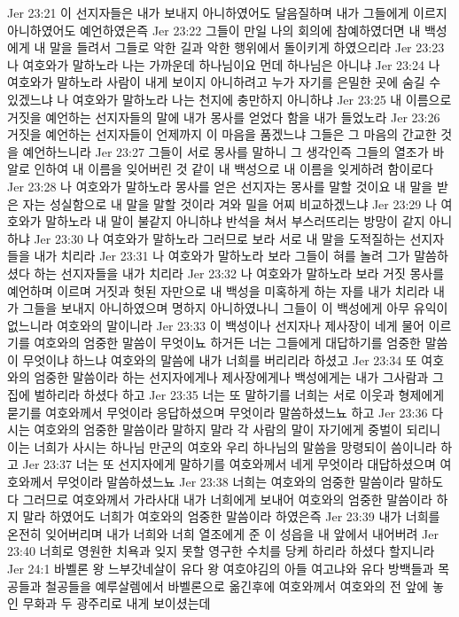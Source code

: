 Jer 23:21  이 선지자들은 내가 보내지 아니하였어도 달음질하며 내가 그들에게 이르지 아니하였어도 예언하였은즉
Jer 23:22  그들이 만일 나의 회의에 참예하였더면 내 백성에게 내 말을 들려서 그들로 악한 길과 악한 행위에서 돌이키게 하였으리라
Jer 23:23  나 여호와가 말하노라 나는 가까운데 하나님이요 먼데 하나님은 아니냐
Jer 23:24  나 여호와가 말하노라 사람이 내게 보이지 아니하려고 누가 자기를 은밀한 곳에 숨길 수 있겠느냐 나 여호와가 말하노라 나는 천지에 충만하지 아니하냐
Jer 23:25  내 이름으로 거짓을 예언하는 선지자들의 말에 내가 몽사를 얻었다 함을 내가 들었노라
Jer 23:26  거짓을 예언하는 선지자들이 언제까지 이 마음을 품겠느냐 그들은 그 마음의 간교한 것을 예언하느니라
Jer 23:27  그들이 서로 몽사를 말하니 그 생각인즉 그들의 열조가 바알로 인하여 내 이름을 잊어버린 것 같이 내 백성으로 내 이름을 잊게하려 함이로다
Jer 23:28  나 여호와가 말하노라 몽사를 얻은 선지자는 몽사를 말할 것이요 내 말을 받은 자는 성실함으로 내 말을 말할 것이라 겨와 밀을 어찌 비교하겠느냐
Jer 23:29  나 여호와가 말하노라 내 말이 불같지 아니하냐 반석을 쳐서 부스러뜨리는 방망이 같지 아니하냐
Jer 23:30  나 여호와가 말하노라 그러므로 보라 서로 내 말을 도적질하는 선지자들을 내가 치리라
Jer 23:31  나 여호와가 말하노라 보라 그들이 혀를 놀려 그가 말씀하셨다 하는 선지자들을 내가 치리라
Jer 23:32  나 여호와가 말하노라 보라 거짓 몽사를 예언하며 이르며 거짓과 헛된 자만으로 내 백성을 미혹하게 하는 자를 내가 치리라 내가 그들을 보내지 아니하였으며 명하지 아니하였나니 그들이 이 백성에게 아무 유익이 없느니라 여호와의 말이니라
Jer 23:33  이 백성이나 선지자나 제사장이 네게 물어 이르기를 여호와의 엄중한 말씀이 무엇이뇨 하거든 너는 그들에게 대답하기를 엄중한 말씀이 무엇이냐 하느냐 여호와의 말씀에 내가 너희를 버리리라 하셨고
Jer 23:34  또 여호와의 엄중한 말씀이라 하는 선지자에게나 제사장에게나 백성에게는 내가 그사람과 그 집에 벌하리라 하셨다 하고
Jer 23:35  너는 또 말하기를 너희는 서로 이웃과 형제에게 묻기를 여호와께서 무엇이라 응답하셨으며 무엇이라 말씀하셨느뇨 하고
Jer 23:36  다시는 여호와의 엄중한 말씀이라 말하지 말라 각 사람의 말이 자기에게 중벌이 되리니 이는 너희가 사시는 하나님 만군의 여호와 우리 하나님의 말씀을 망령되이 씀이니라 하고
Jer 23:37  너는 또 선지자에게 말하기를 여호와께서 네게 무엇이라 대답하셨으며 여호와께서 무엇이라 말씀하셨느뇨
Jer 23:38  너희는 여호와의 엄중한 말씀이라 말하도다 그러므로 여호와께서 가라사대 내가 너희에게 보내어 여호와의 엄중한 말씀이라 하지 말라 하였어도 너희가 여호와의 엄중한 말씀이라 하였은즉
Jer 23:39  내가 너희를 온전히 잊어버리며 내가 너희와 너희 열조에게 준 이 성읍을 내 앞에서 내어버려
Jer 23:40  너희로 영원한 치욕과 잊지 못할 영구한 수치를 당케 하리라 하셨다 할지니라
Jer 24:1  바벨론 왕 느부갓네살이 유다 왕 여호야김의 아들 여고냐와 유다 방백들과 목공들과 철공들을 예루살렘에서 바벨론으로 옮긴후에 여호와께서 여호와의 전 앞에 놓인 무화과 두 광주리로 내게 보이셨는데
